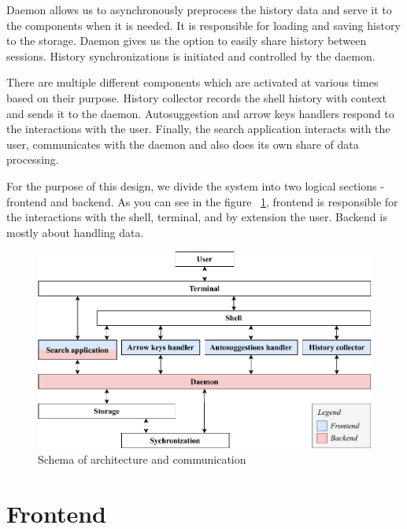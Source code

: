 \documentclass[thesis=M,english]{FITthesis}[2012/10/20]
\newcommand{\tmpframe}[1]{\fbox{#1}}
\renewcommand{\tmpframe}[1]{#1}
\let\myRef\ref
\renewcommand\ref{\unskip~\myRef}
\begin{document}
Daemon allows us to asynchronously preprocess the history data and serve it to the components when it is needed. It is responsible for loading and saving history to the storage. Daemon gives us the option to easily share history between sessions. History synchronizations is initiated and controlled by the daemon.


There are multiple different components which are activated at various times based on their purpose. History collector records the shell history with context and sends it to the daemon. Autosuggestion and arrow keys handlers respond to the interactions with the user. Finally, the search application interacts with the user, communicates with the daemon and also does its own share of data processing.


For the purpose of this design, we divide the system into two logical sections - frontend and backend. As you can see in the figure \ref{design-architecture-layers}, frontend is responsible for the interactions with the shell, terminal, and by extension the user. Backend is mostly about handling data. 

\begin{figure}[h!]
\centering
  \tmpframe{\includegraphics[width=\linewidth]{figures/design/thesis-design-architecture-layers-v2.pdf}}
  \caption{Schema of architecture and communication}
  \label{design-architecture-layers}
\end{figure}

\newpage
\section{Frontend}\label{design-frontend}
\end{document}
